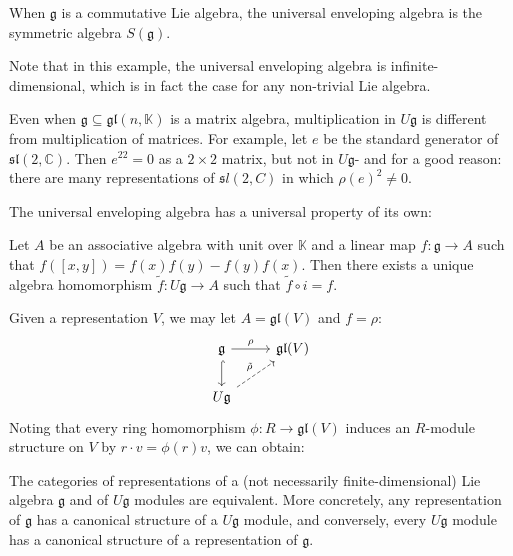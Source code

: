 \documentclass{report}
\begin{document}
\begin{example}
    When $\mathfrak g$ is a commutative Lie algebra, the universal enveloping algebra is the symmetric algebra $S(\mathfrak g)$.
\end{example}
Note that in this example, the universal enveloping algebra is infinite-dimensional, which is in fact the case for any non-trivial Lie algebra.

\begin{remark}
    Even when $\mathfrak g \subseteq \mathfrak{gl}(n, \mathbb K)$ is a matrix algebra, multiplication in $U \mathfrak g$ is different from multiplication of matrices. For example, let $e$ be the standard generator of $\mathfrak{sl}(2, \mathbb C)$. 
    Then $e^22 = 0$ as a $2 \times 2$ matrix, but not in $U \mathfrak g$- and for a good reason: there are many representations of $\mathfrak sl(2, C)$ in which $\rho(e)^2 \neq 0$.
\end{remark}

The universal enveloping algebra has a universal property of its own:
\begin{theorem}
    Let $A$ be an associative algebra with unit over $\mathbb K$ and a linear map $f: \mathfrak g \to A$ such that $f([x,y]) = f(x)f(y) - f(y)f(x)$.
    Then there exists a unique algebra homomorphism $\tilde f: U \mathfrak g \to A$ such that $\tilde f \circ i = f$.
\end{theorem}
Given a representation $V$, we may let $A = \mathfrak{gl}(V)$ and $f = \rho$:
\[
\begin{tikzcd}
    \mathfrak g \arrow[r, "\rho"] \arrow[d, hook] & \mathfrak{gl}(V)\\
    U \mathfrak g \arrow[ur, dashed, "\tilde \rho"]
\end{tikzcd}
\]
Noting that every ring homomorphism $\phi: R \to \mathfrak{gl}(V)$ induces an $R$-module structure on $V$ by $r \cdot v = \phi(r) v$, we can obtain:
\begin{corollary}
    The categories of representations of a (not necessarily finite-dimensional) Lie algebra $\mathfrak g$ and of $U \mathfrak g$ modules are equivalent. 
    More concretely, any representation of $\mathfrak g$ has a canonical structure of a $U \mathfrak g$ module, and conversely, every $U \mathfrak g$ module has a canonical structure of a representation of $\mathfrak g$.
\end{corollary}
\end{document}

